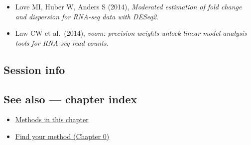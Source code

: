 \documentclass[
]{article}
\newenvironment{Shaded}{\begin{snugshade}}{\end{snugshade}}
\providecommand{\tightlist}{%
  \setlength{\itemsep}{0pt}\setlength{\parskip}{0pt}}
\begin{document}
\begin{itemize}
\tightlist
\item
  Love MI, Huber W, Anders S (2014), \emph{Moderated estimation of fold
  change and dispersion for RNA-seq data with DESeq2}.
\item
  Law CW et al.~(2014), \emph{voom: precision weights unlock linear
  model analysis tools for RNA-seq read counts}.
\end{itemize}

\subsection{Session info}\label{session-info}

\begin{Shaded}
\begin{Highlighting}[]

\end{Highlighting}
\end{Shaded}

\subsection{See also --- chapter index}\label{see-also-chapter-index}

\begin{itemize}
\tightlist
\item
  \href{../index.Rmd}{Methods in this chapter}
\item
  \href{../../../ch00-find-your-method.Rmd}{Find your method (Chapter
  0)}
\end{itemize}
\end{document}
